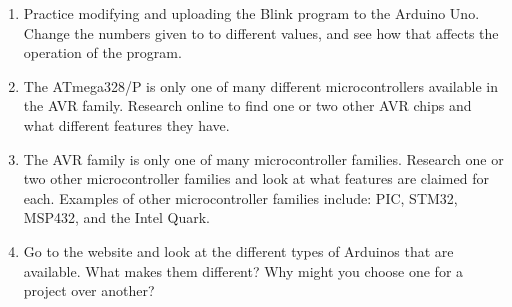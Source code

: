 
\begin{enumerate}
\item Practice modifying and uploading the Blink program to the Arduino Uno.  Change the numbers given to  to different values, and see how that affects the operation of the program.
\item The ATmega328/P is only one of many different microcontrollers available in the AVR family.  Research online to find one or two other AVR chips and what different features they have.
\item The AVR family is only one of many microcontroller families.  Research one or two other microcontroller families and look at what features are claimed for each.  Examples of other microcontroller families include: PIC, STM32, MSP432, and the Intel Quark.
\item Go to the  website and look at the different types of Arduinos that are available.  What makes them different?  Why might you choose one for a project over another?
\end{enumerate}
